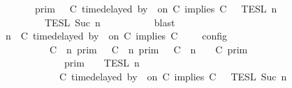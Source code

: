 \begin{isabellebody}
\ \ \ \ \ \ {\isacharequal}\ {\isasymlbrakk}{\isasymlbrakk}\ {\isasymGamma}\ {\isasymrbrakk}{\isasymrbrakk}\isactrlsub p\isactrlsub r\isactrlsub i\isactrlsub m\ {\isasyminter}\ {\isacharparenleft}{\isasymlbrakk}{\isasymlbrakk}\ {\isacharparenleft}C\ time{\isacharminus}delayed\ by\ {\isasymdelta}{\isasymtau}\ on\ C\ implies\ C\ {\isacharhash}\ {\isasymPsi}\ {\isasymrbrakk}{\isasymrbrakk}\isactrlsub T\isactrlsub E\isactrlsub S\isactrlsub L\isactrlbsup {\isasymge}\ n\isactrlesup \isanewline
\ \ \ \ \ \ \ \ {\isasyminter}\ {\isasymlbrakk}{\isasymlbrakk}\ {\isasymPhi}\ {\isasymrbrakk}{\isasymrbrakk}\isactrlsub T\isactrlsub E\isactrlsub S\isactrlsub L\isactrlbsup {\isasymge}\ Suc\ n\isactrlesup {\isacharparenright}{\isacartoucheclose}\isanewline
\ \ \ \ \ \ \isamarkupfalse%
\ {}\ \isamarkupfalse%
\ blast\isanewline
\ \ \ \ \isamarkupfalse%
\ {\isacartoucheopen}{\isasymlbrakk}\ {\isasymGamma}{\isacharcomma}\ n\ {\isasymTurnstile}\ {\isacharparenleft}C\ time{\isacharminus}delayed\ by\ {\isasymdelta}{\isasymtau}\ on\ C\ implies\ C\ {\isacharhash}\ {\isasymPsi}\ {\isasymtriangleright}\ {\isasymPhi}\ {\isasymrbrakk}\isactrlsub c\isactrlsub o\isactrlsub n\isactrlsub f\isactrlsub i\isactrlsub g\isanewline
\ \ \ \ \ \ \ \ \ \ {\isacharequal}\ {\isacharparenleft}{\isasymlbrakk}\ C\ {\isasymnot}{\isasymUp}\ n\ {\isasymrbrakk}\isactrlsub p\isactrlsub r\isactrlsub i\isactrlsub m\ {\isasymunion}\ {\isasymlbrakk}\ C\ {\isasymUp}\ n\ {\isasymrbrakk}\isactrlsub p\isactrlsub r\isactrlsub i\isactrlsub m\ {\isasyminter}\ {\isasymlbrakk}\ C\ {\isacharat}\ n\ {\isasymoplus}\ {\isasymdelta}{\isasymtau}\ {\isasymRightarrow}\ C\ {\isasymrbrakk}\isactrlsub p\isactrlsub r\isactrlsub i\isactrlsub m{\isacharparenright}\isanewline
\ \ \ \ \ \ \ \ \ \ \ \ {\isasyminter}\ {\isacharparenleft}{\isasymlbrakk}{\isasymlbrakk}\ {\isasymGamma}\ {\isasymrbrakk}{\isasymrbrakk}\isactrlsub p\isactrlsub r\isactrlsub i\isactrlsub m\ {\isasyminter}\ {\isacharparenleft}{\isasymlbrakk}{\isasymlbrakk}\ {\isasymPsi}\ {\isasymrbrakk}{\isasymrbrakk}\isactrlsub T\isactrlsub E\isactrlsub S\isactrlsub L\isactrlbsup {\isasymge}\ n\isactrlesup \isanewline
\ \ \ \ \ \ \ \ \ \ \ \ {\isasyminter}\ {\isasymlbrakk}{\isasymlbrakk}\ {\isacharparenleft}C\ time{\isacharminus}delayed\ by\ {\isasymdelta}{\isasymtau}\ on\ C\ implies\ C\ {\isacharhash}\ {\isasymPhi}\ {\isasymrbrakk}{\isasymrbrakk}\isactrlsub T\isactrlsub E\isactrlsub S\isactrlsub L\isactrlbsup {\isasymge}\ Suc\ n\isactrlesup {\isacharparenright}{\isacharparenright}{\isacartoucheclose}\isanewline

\end{isabellebody}

